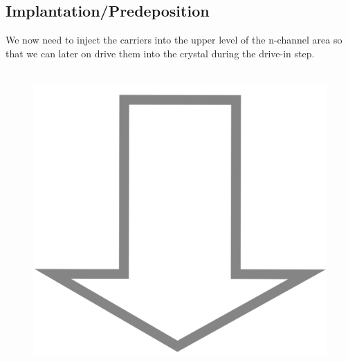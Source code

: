 \newpage

\subsection{Implantation/Predeposition}\label{pwell_implant_step}
We now need to inject the carriers into the upper level of the n-channel area so that we can later on drive them into the crystal during the drive-in step.
\begin{figure}[H]
	\centering
	\begin{tikzpicture}[node distance = 3cm, auto, thick,scale=\CrossSectionOnly, every node/.style={transform shape}]
		
	\end{tikzpicture} \\
	\includegraphics[scale=0.01]{down_arrow.png} \\
	\begin{tikzpicture}[node distance = 3cm, auto, thick,scale=\CrossSectionOnly, every node/.style={transform shape}]
		
	\end{tikzpicture} \\

\end{figure}
